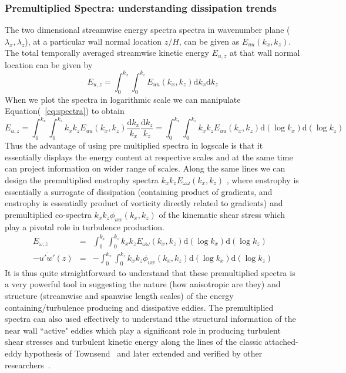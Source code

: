 \subsubsection{Premultiplied Spectra: understanding dissipation trends}
The two dimensional streamwise energy spectra spectra in wavenumber plane ($\lambda_x, \lambda_z$), at a particular wall normal location $z/H$, can be given as $E_{uu}(k_x,k_z)$. The total temporally averaged streamwise kinetic energy $E_{u,z}$ at that wall normal location can be given by
\begin{equation}
E_{u,z} = \int_{0}^{k_x}\int_{0}^{k_z}E_{uu}(k_x,k_z)\mathrm{d}k_x\mathrm{d}k_z \label{eq:spectra}
\end{equation}
When we plot the spectra in logarithmic scale we can manipulate Equation(~\ref{eq:spectra}) to obtain
 \begin{equation}
E_{u,z} = \int_{0}^{k_x}\int_{0}^{k_z}k_xk_zE_{uu}(k_x,k_z)\frac{\mathrm{d}k_x}{k_x}\frac{\mathrm{d}k_z}{k_z} = \int_{0}^{k_x}\int_{0}^{k_z}k_xk_zE_{uu}(k_x,k_z)\mathrm{d}(\log k_x)\mathrm{d}(\log k_z) \label{eq:spectra2}
\end{equation}
Thus the advantage of using pre multiplied spectra in logscale is that it essentially displays the energy content at respective scales and at the same time can project information on wider range of scales. Along the same lines we can design the premultiplied enstrophy spectra $k_xk_zE_{\omega\omega}(k_x,k_z)$ , where enstrophy is essentially a surrogate of dissipation (containing product of gradients, and enstrophy is essentially product of vorticity directly related to gradients) and premultiplied co-spectra $k_xk_z\phi_{uw}(k_x,k_z)$ of the kinematic shear stress which play a pivotal role in turbulence production.
\begin{eqnarray}
E_{\omega,z} & = &  \int_{0}^{k_x}\int_{0}^{k_z}k_xk_zE_{\omega\omega}(k_x,k_z)\mathrm{d}(\log k_x)\mathrm{d}(\log k_z) \\
-\overline{u'w'}(z) & = & -\int_{0}^{k_x}\int_{0}^{k_z}k_xk_z\phi_{uw}(k_x,k_z)\mathrm{d}(\log k_x)\mathrm{d}(\log k_z)
\end{eqnarray}
It is thus quite straightforward to understand that these premultiplied spectra is a very powerful tool in suggesting the nature (how anisotropic are they) and structure (streamwise and spanwise length scales) of the energy containing/turbulence producing and dissipative eddies. The premultiplied spectra can also used effectively to understand tthe structural information of the near wall ``active" eddies which play a significant role in producing turbulent shear stresses and turbulent kinetic energy along the lines of the classic attached-eddy hypothesis of Townsend~\cite{town1,town2} and later extended and verified by other researchers~\cite{perry,balad,jimrev}.\\
